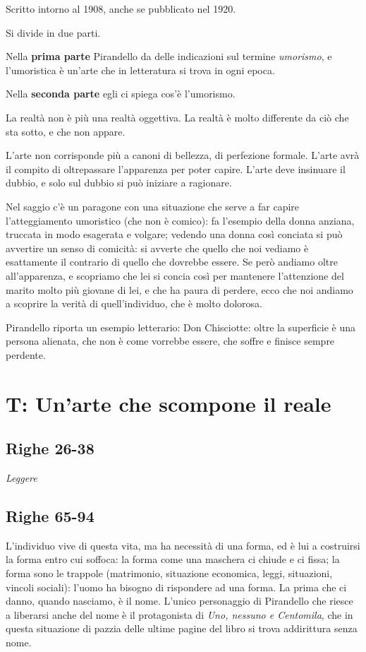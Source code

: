 Scritto intorno al 1908, anche se pubblicato nel 1920.

Si divide in due parti.

Nella \textbf{prima parte} Pirandello da delle indicazioni sul termine \textit{umorismo}, e l'umoristica è un'arte che in letteratura si trova in ogni epoca.

Nella \textbf{seconda parte} egli ci spiega cos'è l'umorismo.

La realtà non è più una realtà oggettiva. La realtà è molto differente da ciò che sta sotto, e che non appare.

L'arte non corrisponde più a canoni di bellezza, di perfezione formale. L'arte avrà il compito di oltrepassare l'apparenza per poter capire. L'arte deve insinuare il dubbio, e solo sul dubbio si può iniziare a ragionare.

Nel saggio c'è un paragone con una situazione che serve a far capire l'atteggiamento umoristico (che non è comico): fa l'esempio della donna anziana, truccata in modo esagerata e volgare; vedendo una donna così conciata si può avvertire un senso di comicità: si avverte che quello che noi vediamo è esattamente il contrario di quello che dovrebbe essere. Se però andiamo oltre all'apparenza, e scopriamo che lei si concia così per mantenere l'attenzione del marito molto più giovane di lei, e che ha paura di perdere, ecco che noi andiamo a scoprire la verità di quell'individuo, che è molto dolorosa.

Pirandello riporta un esempio letterario: Don Chisciotte: oltre la superficie è una persona alienata, che non è come vorrebbe essere, che soffre e finisce sempre perdente.

\section{T: Un'arte che scompone il reale}

\subsection{Righe 26-38}

\emph{Leggere}

\subsection{Righe 65-94}

L'individuo vive di questa vita, ma ha necessità di una forma, ed è lui a costruirsi la forma entro cui soffoca: la forma come una maschera ci chiude e ci fissa; la forma sono le trappole (matrimonio, situazione economica, leggi, situazioni, vincoli sociali): l'uomo ha bisogno di rispondere ad una forma.
La prima che ci danno, quando nasciamo, è il nome. L'unico personaggio di Pirandello che riesce a liberarsi anche del nome è il protagonista di \textit{Uno, nessuno e Centomila}, che in questa situazione di pazzia delle ultime pagine del libro si trova addirittura senza nome.

